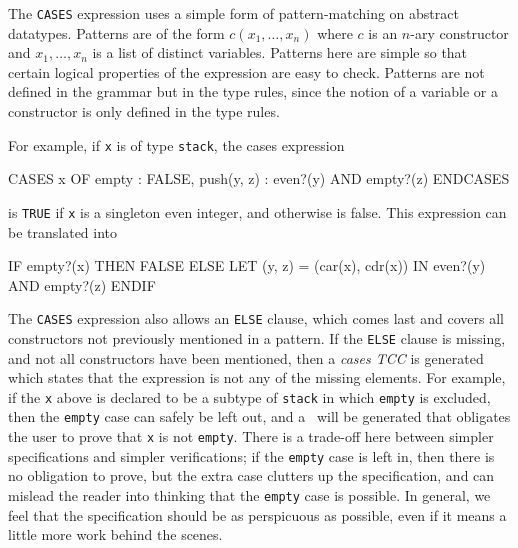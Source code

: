 The \texttt{CASES} expression uses a simple form of pattern-matching on
abstract datatypes.  Patterns are of the form $c(x_1,\ldots, x_n)$ where
$c$ is an $n$-ary constructor and $x_1,\ldots, x_n$ is a list of distinct
variables.  Patterns here are simple so that certain logical properties of
the expression are easy to check.  Patterns are not defined in the grammar
but in the type rules, since the notion of a variable or a constructor is
only defined in the type rules.

For example, if \texttt{x} is of type \texttt{stack}, the cases expression
\begin{pvsex}
  CASES x OF
    empty : FALSE,
    push(y, z) : even?(y) AND empty?(z)
  ENDCASES
\end{pvsex}
is \texttt{TRUE} if \texttt{x} is a singleton even integer, and otherwise is
false.  This expression can be translated into
\begin{pvsex}
  IF empty?(x)
     THEN FALSE
     ELSE LET (y, z) = (car(x), cdr(x))
           IN even?(y) AND empty?(z)
  ENDIF
\end{pvsex}

The \texttt{CASES} expression also allows an \texttt{ELSE} clause, which
comes last and covers all constructors not previously mentioned in a
pattern.  If the \texttt{ELSE} clause is missing, and not all constructors
have been mentioned, then a \emph{cases TCC} is generated which states that the expression is not
any of the missing elements.  For example, if the \texttt{x} above is
declared to be a subtype of \texttt{stack} in which \texttt{empty} is
excluded, then the \texttt{empty} case can safely be left out, and a \tcc\
will be generated that obligates the user to prove that \texttt{x} is not
\texttt{empty}.  There is a trade-off here between simpler specifications
and simpler verifications; if the \texttt{empty} case is left in, then
there is no obligation to prove, but the extra case clutters up the
specification, and can mislead the reader into thinking that the
\texttt{empty} case is possible.  In general, we feel that the
specification should be as perspicuous as possible, even if it means a
little more work behind the scenes.
